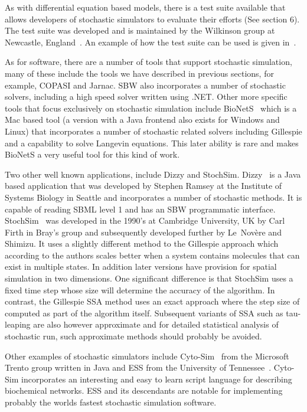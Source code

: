 \documentclass[12pt]{article}
\begin{document}
As with differential equation based models, there is a test suite
available that allows developers of stochastic simulators to
evaluate their efforts (See section 6). The test suite was developed
and is maintained by the Wilkinson group at Newcastle,
England~\citep{Evans:2007}. An example of how the test suite can be
used is given in~\citet{RoaSauro:2007}.

As for software, there are a number of tools that support stochastic
simulation, many of these include the tools we have described in
previous sections, for example, COPASI and Jarnac. SBW also
incorporates a number of stochastic solvers, including a high speed
solver written using .NET. Other more specific tools that focus
exclusively on stochastic simulation include
BioNetS~\citep{Adalsteinsson:2004} which is a Mac based tool (a
version with a Java frontend also exists for Windows and Linux) that
incorporates a number of stochastic related solvers including
Gillespie and a capability to solve Langevin equations. This later
ability is rare and makes BioNetS a very useful tool for this kind
of work.

Two other well known applications, include Dizzy and StochSim.
Dizzy~\citep{Ramsey:2005} is a Java based  application that was
developed by Stephen Ramsey at the Institute of Systems Biology in
Seattle and incorporates a number of stochastic methods. It is
capable of reading SBML level 1 and has an SBW programmatic
interface. StochSim~\citep{LeNovere:2001} was developed in the 1990's at
Cambridge University, UK by Carl Firth in Bray's group and subsequently developed further by Le~Nov{\`e}re and Shimizu. It uses a slightly different method to the Gillespie approach which according
to the authors scales better when a system contains molecules that
can exist in multiple states. In addition later versions have
provision for spatial simulation in two dimensions. One significant
difference is that StochSim uses a fixed time step whose size will
determine the accuracy of the algorithm. In contrast, the Gillespie
SSA method uses an exact approach where the step size of computed as
part of the algorithm itself. Subsequent variants of SSA such as
tau-leaping are also however approximate and for detailed
statistical analysis of stochastic run, such approximate methods
should probably be avoided.

Other examples of stochastic simulators include
Cyto-Sim~\citep{Sedwards:2007} from the Microsoft Trento group
written in Java and ESS from the University of
Tennessee~\citep{cox:2003}. Cyto-Sim incorporates an interesting and
easy to learn script language for describing biochemical networks.
ESS and its descendants are notable for implementing probably the
worlds fastest stochastic simulation software.
\end{document}
